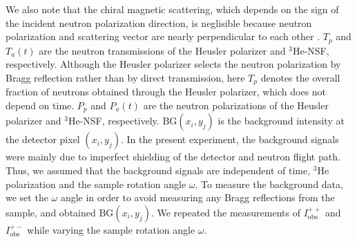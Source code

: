 \documentclass[%
 reprint,
superscriptaddress,
 amsmath,amssymb,
 aps,
floatfix,
]{revtex4-2}
\newcommand{\He}{$^3$He }
\newcommand{\Hensf}{$^3$He-NSF}
\begin{document}
We also note that the chiral magnetic scattering, which depends on the sign of the incident neutron polarization direction, is neglisible because neutron polarization and scattering vector are nearly perpendicular to each other \cite{blume_polarization_1963}. %
$T_p$ and $T_a(t)$ are the neutron transmissions of the Heusler polarizer and \Hensf, respectively.
Although the Heusler polarizer selects the neutron polarization by Bragg reflection rather than by direct transmission, here $T_p$ denotes the overall fraction of neutrons obtained through the Heusler polarizer, which does not depend on time.
$P_p$ and $P_a(t)$ are the neutron polarizations of the Heusler polarizer and \Hensf, respectively.
$\mathrm{BG}(x_i,y_j)$ is the background intensity at the detector pixel $(x_i, y_j)$.
In the present experiment, the background signals were mainly due to imperfect shielding of the detector and neutron flight path.
Thus, we assumed that the background signals are independent of time, \He polarization and the sample rotation angle $\omega$. %
To measure the background data, we set the $\omega$ angle in order to avoid measuring any Bragg reflections from the sample, and obtained $\mathrm{BG}(x_i,y_j)$.
We repeated the measurements of $I^{++}_\mathrm{obs}$ and $I^{+-}_\mathrm{obs}$ while varying the sample rotation angle $\omega$.
\end{document}
